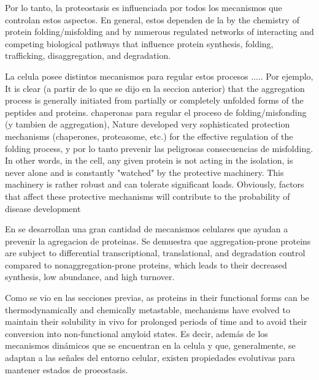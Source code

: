 Por lo tanto, la proteostasis es influenciada por todos los mecanismos que controlan estos aspectos.
En general, estos dependen de la 
by the chemistry of protein folding/misfolding and by numerous regulated networks of interacting and competing biological pathways 
that influence protein synthesis, folding, trafficking, disaggregation, and degradation.

La celula posee distintos mecanismos para regular estos procesos .....
Por ejemplo, 
It  is  clear (a partir de lo que se dijo en la seccion anterior)  that  the aggregation  process  is  generally   initiated  from  partially  or completely  unfolded  forms  of  the  peptides  and  proteins. 
chaperonas para regular el proceso de folding/misfonding (y tambien de aggregation), 
Nature developed very sophisticated protection mechanisms (chaperones, proteasome, etc.) for the effective regulation of the folding process, y por lo tanto prevenir las peligrosas consecuencias de misfolding. 
In other words, in the cell, any given protein is not acting in the isolation, is never alone and is constantly "watched" by the protective machinery. This machinery is rather robust and can
tolerate significant loads. Obviously, factors that affect these protective mechanisms will contribute to the probability of disease development



En \cite{gsponer2012cellular} se desarrollan una gran cantidad de mecanismos celulares que ayudan a prevenir la agregacion de proteinas. 
Se demuestra que aggregation-prone proteins are subject to differential transcriptional, translational, and degradation control compared to nonaggregation-prone proteins, which leads to their decreased
synthesis, low abundance, and high turnover. 

Como se vio en las secciones previas, 
as proteins in their functional forms can be thermodynamically and chemically metastable, mechanisms have evolved to maintain their solubility in vivo for prolonged periods of
time and to avoid their conversion into non-functional amyloid states.
Es decir, además de los mecanismos dinámicos que se encuentran en la celula y que, generalmente, se adaptan a las señales del entorno celular, existen propiedades evolutivas para mantener estados de proeostasis.

